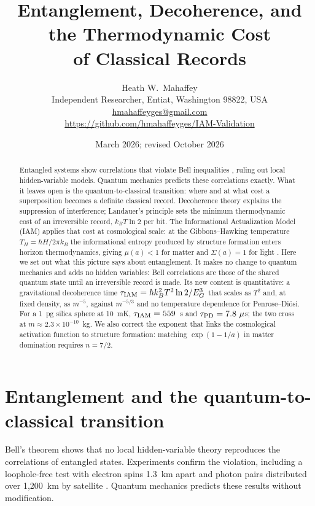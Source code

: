 \documentclass[12pt,a4paper]{article}
\title{\textbf{Entanglement, Decoherence, and the Thermodynamic Cost\\
of Classical Records}}
\author{Heath W.\ Mahaffey\\
\small Independent Researcher, Entiat, Washington 98822, USA\\
\small \href{mailto:hmahaffeyges@gmail.com}{hmahaffeyges@gmail.com}\\
\small \url{https://github.com/hmahaffeyges/IAM-Validation}}
\date{March 2026; revised October 2026}
\begin{document}
\maketitle

\begin{abstract}
Entangled systems show correlations that violate Bell inequalities
\citep{Bell1964,Aspect1982,Hensen2015}, ruling out local hidden-variable models.
Quantum mechanics predicts these correlations exactly. What it leaves open is the
quantum-to-classical transition: where and at what cost a superposition becomes a
definite classical record. Decoherence theory \citep{Zurek1981,JoosZeh1985,Zurek2003}
explains the suppression of interference; Landauer's principle \citep{Landauer1961}
sets the minimum thermodynamic cost of an irreversible record, $k_BT\ln2$ per bit.
The Informational Actualization Model (IAM) applies that cost at cosmological scale:
at the Gibbons--Hawking temperature $T_H=\hbar H/2\pi k_B$ the informational entropy
produced by structure formation enters horizon thermodynamics, giving
$\mu(a)<1$ for matter and $\Sigma(a)=1$ for light \citep{IAM_theory}. Here we set out
what this picture says about entanglement. It makes no change to quantum
mechanics and adds no hidden variables: Bell correlations are those of the shared
quantum state until an irreversible record is made. Its new content is
quantitative: a gravitational decoherence time
$\tau_{\rm IAM}=\hbar k_B^2T^2\ln2/E_G^3$ that scales as $T^2$ and, at fixed
density, as $m^{-5}$, against $m^{-5/3}$ and no temperature dependence for
Penrose--Di\'osi. For a 1~pg silica sphere at 10~mK, $\tau_{\rm IAM}=559$~s and
$\tau_{\rm PD}=7.8~\mu$s; the two cross at $m\approx2.3\times10^{-10}$~kg. We also
correct the exponent that links the cosmological activation function to structure
formation: matching $\exp(1-1/a)$ in matter domination requires $n=7/2$.
\end{abstract}

\section{Entanglement and the quantum-to-classical transition}
\label{sec:intro}

Bell's theorem \citep{Bell1964} shows that no local hidden-variable theory reproduces
the correlations of entangled states. Experiments confirm the violation, including a
loophole-free test with electron spins 1.3~km apart \citep{Hensen2015} and photon
pairs distributed over 1,200~km by satellite \citep{Yin2017}. Quantum mechanics
predicts these results without modification.
\end{document}
